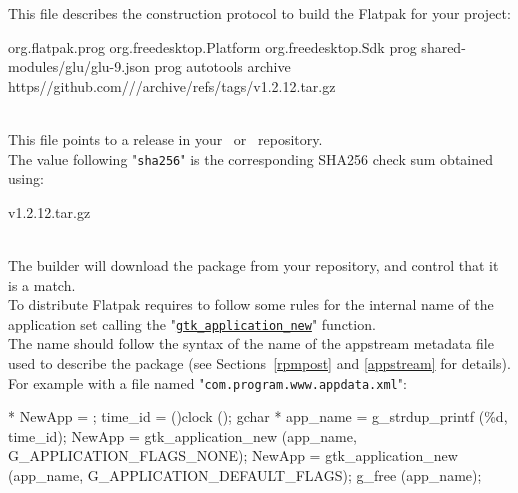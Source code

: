 This file describes the construction protocol to build the Flatpak for your project:
{\footnotesize{
\begin{script}
 org.flatpak.prog
 org.freedesktop.Platform
 
 org.freedesktop.Sdk
 prog
  \bbtt{-} shared-modules/glu/glu-9.json
  \bbtt{-}  prog
     autotools
     
      \bbtt{-}  archive
         https//github.com///archive/refs/tags/v1.2.12.tar.gz
         
\end{script}
}}
\\[-0.5cm]
\noindent This file points to a release in your \github\ or \gitlab\ repository. \\
The value following "\texttt{sha256}" is the corresponding SHA256 check sum obtained using: 
\begin{script}
 v1.2.12.tar.gz
\end{script} \\[-0.5cm]
\noindent
The builder will download the package from your repository, and control that it is a match. 
\newpage
{}\\[0.25cm]
To distribute Flatpak requires to follow some rules for the internal name of the application set calling the "\href{https://docs.gtk.org/gtk4/ctor.Application.new.html}{\texttt{gtk\_application\_new}}" function. \\
The name should follow the syntax of the name of the appstream metadata file used to describe the package (see Sections~\ref{rpmpost} and \ref{appstream} for details). \\[0.25cm]
For example with a file named "\texttt{com.program.www.appdata.xml}":
\begin{script}
 * NewApp = ;
 time\_id = ()clock ();
gchar * app\_name = g\_strdup\_printf (\%d, time\_id);
 
  NewApp = gtk\_application\_new (app\_name, G\_APPLICATION\_FLAGS\_NONE);
  NewApp = gtk\_application\_new (app\_name, G\_APPLICATION\_DEFAULT\_FLAGS);
g\_free (app\_name);
\end{script}

